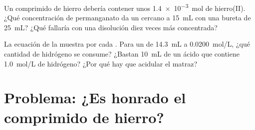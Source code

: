 \begin{exercise}[$\star\star\star$]\label{exo:g11:titration:14}
Un comprimido de hierro debería contener unos \qty{1.4e-3}{mol} de
hierro(II). ¿Qué concentración de permanganato da un  cercano a \qty{15}{mL} con una bureta de \qty{25}{mL}? ¿Qué
fallaría con una disolución diez veces más concentrada?
\end{exercise}

\begin{exercise}[$\star\star\star$]\label{exo:g11:titration:15}
La ecuación de la  muestra  por cada . Para
un  de \qty{14.3}{mL} a \qty{0.0200}{mol/L}, ¿qué
cantidad de  hidrógeno se consume? ¿Bastan \qty{10}{mL} de un ácido
que contiene \qty{1.0}{mol/L} de  hidrógeno? ¿Por qué hay que
acidular el matraz?
\end{exercise}

\section{Problema: ¿Es honrado el comprimido de hierro?}


